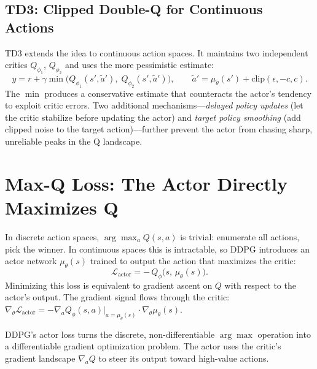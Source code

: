 \subsection{TD3: Clipped Double-Q for Continuous Actions}

TD3 extends the idea to continuous action spaces. It maintains two independent critics $Q_{\phi_1}$, $Q_{\phi_2}$ and uses the more pessimistic estimate:
\begin{equation}
  y = r + \gamma \min\bigl(Q_{\phi_1}(s', \tilde{a}'),\; Q_{\phi_2}(s', \tilde{a}')\bigr),
  \qquad
  \tilde{a}' = \mu_{\bar\theta}(s') + \text{clip}(\epsilon, -c, c).
  \label{eq:td3-target}
\end{equation}
The $\min$ produces a conservative estimate that counteracts the actor's tendency to exploit critic errors. Two additional mechanisms---\emph{delayed policy updates} (let the critic stabilize before updating the actor) and \emph{target policy smoothing} (add clipped noise to the target action)---further prevent the actor from chasing sharp, unreliable peaks in the Q landscape.

\section{Max-Q Loss: The Actor Directly Maximizes Q}
\label{sec:max-q}

In discrete action spaces, $\arg\max_a Q(s,a)$ is trivial: enumerate all actions, pick the winner. In continuous spaces this is intractable, so DDPG introduces an actor network $\mu_\theta(s)$ trained to output the action that maximizes the critic:
\begin{equation}
  \mathcal{L}_{\text{actor}} = -\,Q_\phi\!\bigl(s,\, \mu_\theta(s)\bigr).
  \label{eq:ddpg-actor}
\end{equation}
Minimizing this loss is equivalent to gradient ascent on $Q$ with respect to the actor's output. The gradient signal flows through the critic: $\nabla_\theta \mathcal{L}_{\text{actor}} = -\nabla_a Q_\phi(s,a)\big|_{a=\mu_\theta(s)} \cdot \nabla_\theta \mu_\theta(s)$.

\begin{keyidea}
DDPG's actor loss turns the discrete, non-differentiable $\arg\max$ operation into a differentiable gradient optimization problem. The actor uses the critic's gradient landscape $\nabla_a Q$ to steer its output toward high-value actions.
\end{keyidea}

